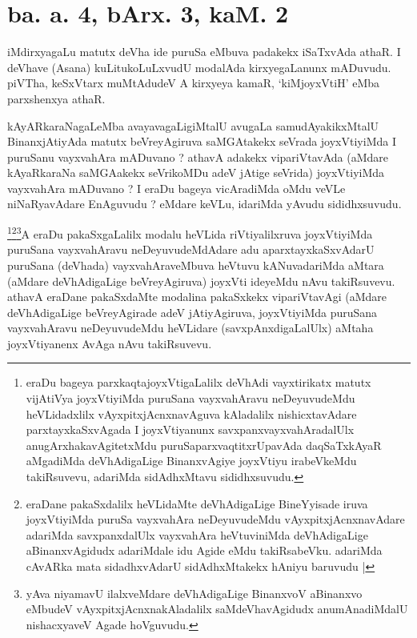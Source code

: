 \section*{ba. a. 4, bArx. 3, kaM. 2}

\begin{artha}
iMdirxyagaLu matutx deVha ide puruSa eMbuva padakekx iSaTxvAda athaR. I deVhave (Asana) kuLitukoLuLxvudU modalAda kirxyegaLanunx mADuvudu. piVTha, keSxVtarx muMtAdudeV A kirxyeya kamaR, `kiMjoyxVtiH' eMba parxshenxya athaR.
\end{artha}

\begin{artha}
kAyARkaraNagaLeMba avayavagaLigiMtalU avugaLa samudAyakikxMtalU BinanxjAtiyAda matutx beVreyAgiruva saMGAtakekx seVrada joyxVtiyiMda I puruSanu vayxvahAra mADuvano ? athavA adakekx vipariVtavAda (aMdare kAyaRkaraNa saMGAakekx seVrikoMDu adeV jAtige seVrida) joyxVtiyiMda vayxvahAra mADuvano ? I eraDu bageya vicAradiMda oMdu veVLe niNaRyavAdare EnAguvudu ? eMdare keVLu, idariMda yAvudu sididhxsuvudu.
\end{artha}

\begin{artha}
\footnote{eraDu bageya parxkaqtajoyxVtigaLalilx deVhAdi vayxtirikatx matutx vijAtiVya joyxVtiyiMda puruSana vayxvahAravu neDeyuvudeMdu heVLidadxlilx vAyxpitxjAcnxnavAguva kAladalilx nishicxtavAdare parxtayxkaSxvAgada I joyxVtiyanunx savxpanxvayxvahAradalUlx anugArxhakavAgitetxMdu puruSaparxvaqtitxrUpavAda daqSaTxkAyaR aMgadiMda deVhAdigaLige BinanxvAgiye joyxVtiyu irabeVkeMdu takiRsuvevu, adariMda sidAdhxMtavu sididhxsuvudu.}\footnote{eraDane pakaSxdalilx heVLidaMte deVhAdigaLige BineYyisade iruva joyxVtiyiMda puruSa vayxvahAra neDeyuvudeMdu vAyxpitxjAcnxnavAdare adariMda savxpanxdalUlx vayxvahAra heVtuviniMda deVhAdigaLige aBinanxvAgidudx adariMdale idu Agide eMdu takiRsabeVku. adariMda cAvARka mata sidadhxvAdarU sidAdhxMtakekx hAniyu baruvudu |}\footnote{yAva niyamavU ilalxveMdare deVhAdigaLige BinanxvoV aBinanxvo eMbudeV vAyxpitxjAcnxnakAladalilx saMdeVhavAgidudx anumAnadiMdalU nishacxyaveV Agade hoVguvudu.}A eraDu pakaSxgaLalilx modalu heVLida riVtiyalilxruva joyxVtiyiMda puruSana vayxvahAravu neDeyuvudeMdAdare adu aparxtayxkaSxvAdarU puruSana (deVhada) vayxvahAraveMbuva heVtuvu kANuvadariMda aMtara (aMdare deVhAdigaLige beVreyAgiruva) joyxVti ideyeMdu nAvu takiRsuvevu. athavA eraDane pakaSxdaMte modalina pakaSxkekx vipariVtavAgi (aMdare deVhAdigaLige beVreyAgirade adeV jAtiyAgiruva, joyxVtiyiMda puruSana vayxvahAravu neDeyuvudeMdu heVLidare (savxpAnxdigaLalUlx) aMtaha joyxVtiyanenx AvAga nAvu takiRsuvevu. 
\end{artha}

